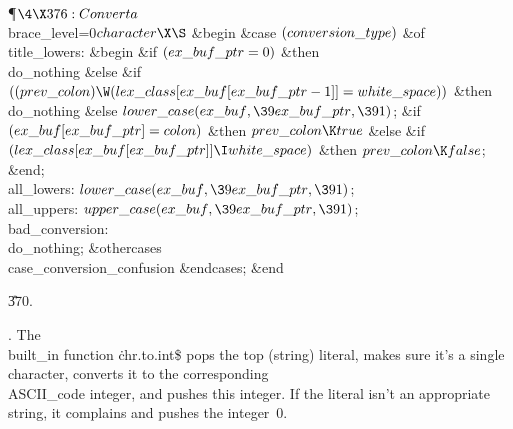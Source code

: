 \Y\P$\4\X376:Convert a $\\{brace\_level}=0$ character\X\S$\6
\&{begin} \&{case} $(\\{conversion\_type})$ \1\&{of}\6
\4\\{title\_lowers}: \&{begin} \&{if} $(\\{ex\_buf\_ptr}=0)$ \1\&{then}\5
\\{do\_nothing}\6
\4\&{else} \&{if} $((\\{prev\_colon})\W(\\{lex\_class}[\\{ex\_buf}[\\{ex\_buf%
\_ptr}-1]]=\\{white\_space}))$ \1\&{then}\5
\\{do\_nothing}\6
\4\&{else} $\\{lower\_case}(\\{ex\_buf},\39\\{ex\_buf\_ptr},\391)$;\2\2\6
\&{if} $(\\{ex\_buf}[\\{ex\_buf\_ptr}]=\\{colon})$ \1\&{then}\5
$\\{prev\_colon}\K\\{true}$\6
\4\&{else} \&{if} $(\\{lex\_class}[\\{ex\_buf}[\\{ex\_buf\_ptr}]]\I\\{white%
\_space})$ \1\&{then}\5
$\\{prev\_colon}\K\\{false}$;\2\2\6
\&{end};\6
\4\\{all\_lowers}: $\\{lower\_case}(\\{ex\_buf},\39\\{ex\_buf\_ptr},\391)$;\6
\4\\{all\_uppers}: $\\{upper\_case}(\\{ex\_buf},\39\\{ex\_buf\_ptr},\391)$;\6
\4\\{bad\_conversion}: \\{do\_nothing};\6
\4\&{othercases} \\{case\_conversion\_confusion}\2\6
\&{endcases};\6
\&{end}\par
\U370.\fi

.
The \\{built\_in} function {\.{chr.to.int\$}} pops the top (string)
literal, makes sure it's a single character, converts it to the
corresponding \\{ASCII\_code} integer, and pushes this integer.  If the
literal isn't an appropriate string, it complains and pushes the
integer~0.

